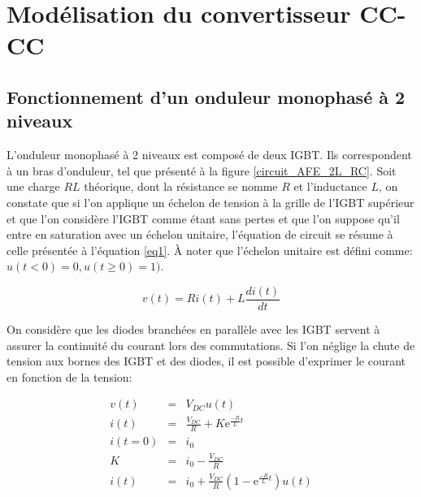 \chapter{Modélisation du convertisseur CC-CC}
\section{Fonctionnement d'un onduleur monophasé à 2 niveaux}
L'onduleur monophasé à 2 niveaux est composé de deux IGBT. Ils correspondent à un bras d'onduleur, tel que présenté à la figure \ref{circuit_AFE_2L_RC}. Soit une charge $RL$ théorique, dont la résistance se nomme $R$ et l'inductance $L$, on constate que si l'on applique un échelon de tension à la grille de l'IGBT supérieur et que l'on considère l'IGBT comme étant sans pertes et que l'on suppose qu'il entre en saturation avec un échelon unitaire, l'équation de circuit se résume à celle présentée à l'équation \ref{eq1}. À noter que l'échelon unitaire est défini comme: $u(t<0) = 0, u(t\geq 0) = 1)$.

\begin{equation}
\label{eq1}
v(t) = R i(t) + L \frac{d i(t)}{dt}
\end{equation}

On considère que les diodes branchées en parallèle avec les IGBT servent à assurer la continuité du courant lors des commutations. Si l'on néglige la chute de tension aux bornes des IGBT et des diodes, il est possible d'exprimer le courant en fonction de la tension:

\begin{eqnarray}
v(t) &=& V_{DC} u(t)\\
i(t) &=& \frac{V_{DC}}{R} + K \mbox{e}^{\frac{-R}{L}t}\\
i(t=0) &=& i_0\\
K &=& i_0 - \frac{V_{DC}}{R} \\
i(t) &=& i_0  + \frac{V_{DC}}{R}\left(1 - \mbox{e}^{\frac{-R}{L}t}\right)u(t)
\end{eqnarray}


